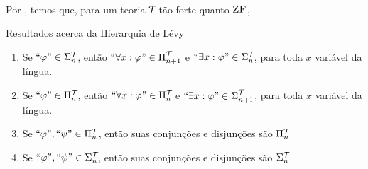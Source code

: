             \paragraph{}
                Por \cite{DRAKE}, temos que, para um teoria $\mathcal{T}_{}$ tão forte quanto $\text{\sc ZF}$,
                \begin{theorem}{Resultados acerca da Hierarquia de Lévy}
                    \begin{enumerate}[label=(\alph*)]
                        \item Se $\text{``}\varphi\text{''}\in\Sigma^{\mathcal{T}_{}}_{n}$, então $\text{``}\forall x:\varphi\text{''} \in\Pi^{\mathcal{T}_{}}_{n+1}$ e 
                            $\text{``}\exists x:\varphi\text{''}\in\Sigma^{\mathcal{T}_{}}_{n}$, para toda $x$ variável da língua.

                        \item Se $\text{``}\varphi\text{''}\in\Pi^{\mathcal{T}_{}}_{n}$,  então $\text{``}\forall x:\varphi\text{''} \in\Pi^{\mathcal{T}_{}}_{n}$ e 
                            $\text{``}\exists x:\varphi\text{''}\in\Sigma^{\mathcal{T}_{}}_{n+1}$, para toda $x$ variável da língua.
                            
                        \item Se $\text{``}\varphi\text{''}, \text{``}\psi\text{''}\in\Pi^{\mathcal{T}_{}}_{n}$, então  suas conjunções e disjunções são $\Pi^{\mathcal{T}_{}}_{n}$

                        \item Se $\text{``}\varphi\text{''}, \text{``}\psi\text{''}\in\Sigma^{\mathcal{T}_{}}_{n}$, então suas conjunções e disjunções são $\Sigma^{\mathcal{T}_{}}_{n}$


\end{enumerate}
\end{theorem}
